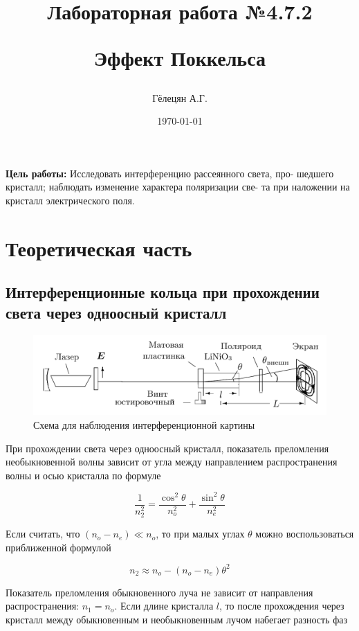 \documentclass{article}
\title{\begin{center}Лабораторная работа №4.7.2\end{center}
Эффект Поккельса}
\author{Гёлецян А.Г.}
\date{\today}
\begin{document}
\maketitle
\newpage
{}

\textbf{Цель работы:} Исследовать интерференцию рассеянного света, про-
шедшего кристалл; наблюдать изменение характера поляризации све-
та при наложении на кристалл электрического поля.

\section{Теоретическая часть}
\subsection{Интерференционные кольца при прохождении света через одноосный кристалл}
\begin{figure}[h]
    \center\includegraphics[width = 0.8\linewidth]{ustanovka_kolca.png}
    \caption{Схема для наблюдения интерференционной картины}\label{fig:ustanovka_kolca}
\end{figure}

При прохождении света через одноосный кристалл, показатель преломления необыкновенной
волны зависит от угла между направлением распространения волны и осью кристалла
по формуле

\begin{equation}
    \frac{1}{n_2^2} = \frac{\cos^2 \theta}{n_o^2} + \frac{\sin^2 \theta}{n_e^2}
    \label{eq:pokazatel_prelomlenia}
\end{equation}

Если считать, что $(n_o - n_e) \ll n_o$, то при малых углах $\theta$ можно
воспользоваться приближенной формулой

\begin{equation}
    n_2 \approx n_o - (n_o - n_e) \theta^2
    \label{eq:pokazatel_prelomlenia_approx}
\end{equation}

Показатель преломления обыкновенного луча не зависит от направления распространения:
$n_1 = n_o$. Если длине кристалла $l$, то после прохождения через кристалл между
обыкновенным и необыкновенным лучом набегает разность фаз
\end{document}
